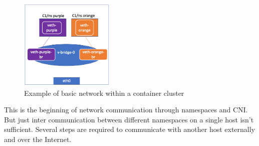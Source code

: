 \begin{figure}[htbp]
 \centering
 \includegraphics[width=0.4\textwidth]{gfx/examples/network_ns}
 \caption{Example of basic network within a container cluster}
\label{sec:intro:containerization:linux_namespaces:netowork_ns}
\end{figure}
This is the beginning of network communication through namespaces and CNI. But just inter communication between different namespaces on a single host isn't sufficient. Several steps are required to communicate with another host externally and over the Internet.

